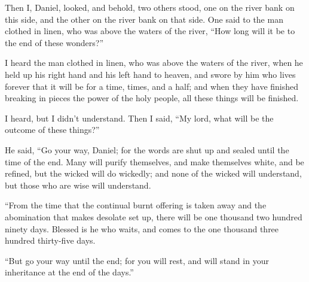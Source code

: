 \myverse{}Then I, Daniel, looked, and behold, two others stood, one on the
river bank on this side, and the other on the river bank on that side.
\myverse{}One said to the man clothed in linen, who was above the waters of the river,
“How long will it be to the end of these wonders?”

\myverse{}I heard the man clothed in linen, who was above the waters of
the river, when he held up his right hand and his left hand to heaven, and swore by him who lives forever
that it will be for a time, times, and a half; and when they have finished breaking in pieces the power
of the holy people, all these things will be finished.

\myverse{}I heard, but I didn’t understand. Then I said, “My lord, what
will be the outcome of these things?”

\myverse{}He said, “Go your way, Daniel; for the words are shut up and sealed
until the time of the end.
\myverse{}Many will purify themselves, and make themselves white, and be refined, but
the wicked will do wickedly; and none of the wicked will understand, but those who are wise will understand.

\myverse{}“From the time that the continual burnt offering is taken away
and the abomination that makes desolate set up, there will be one thousand two hundred ninety days.
\myverse{}Blessed is he who waits, and comes to the one thousand three hundred thirty-five
days.

\myverse{}“But go your way until the end; for you will rest, and will
stand in your inheritance at the end of the days.”


